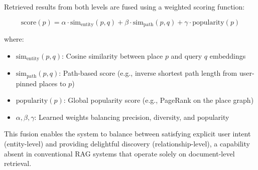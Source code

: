 \documentclass{article} %
\begin{document}
Retrieved results from both levels are fused using a weighted scoring function:

\begin{equation}
\text{score}(p) = \alpha \cdot \text{sim}_{\text{entity}}(p, q) + \beta \cdot \text{sim}_{\text{path}}(p, q) + \gamma \cdot \text{popularity}(p)
\end{equation}

where:
\begin{itemize}
    \item $\text{sim}_{\text{entity}}(p, q)$: Cosine similarity between place $p$ and query $q$ embeddings
    \item $\text{sim}_{\text{path}}(p, q)$: Path-based score (e.g., inverse shortest path length from user-pinned places to $p$)
    \item $\text{popularity}(p)$: Global popularity score (e.g., PageRank on the place graph)
    \item $\alpha, \beta, \gamma$: Learned weights balancing precision, diversity, and popularity
\end{itemize}

This fusion enables the system to balance between satisfying explicit user intent (entity-level) and providing delightful discovery (relationship-level), a capability absent in conventional RAG systems that operate solely on document-level retrieval.




\end{document}
